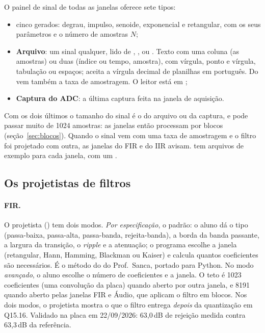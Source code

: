 O painel de sinal de todas as janelas oferece sete tipos:

\begin{itemize}
  \item cinco gerados: degrau, impulso, senoide, exponencial e retangular, com
    os seus parâmetros e o número de amostras \(N\);
  \item \textbf{Arquivo}: um sinal qualquer, lido de , ,
     ou . Texto com uma coluna (as amostras) ou duas
    (índice ou tempo, amostra), com vírgula, ponto e vírgula, tabulação ou
    espaços; aceita a vírgula decimal de planilhas em português. Do
     vem também a taxa de amostragem. O leitor está em
    ;
  \item \textbf{Captura do ADC}: a última captura feita na janela de aquisição.
\end{itemize}

Com os dois últimos o tamanho do sinal é o do arquivo ou da captura, e pode
passar muito de 1024 amostras: as janelas então processam por blocos
(seção~\ref{sec:blocos}). Quando o sinal vem com uma taxa de amostragem e o
filtro foi projetado com outra, as janelas do FIR e do IIR avisam.
 tem arquivos de exemplo para cada janela, com um
.

\subsection*{Os projetistas de filtros}

\paragraph{FIR.} O projetista () tem dois modos. \emph{Por
especificação}, o padrão: o aluno dá o tipo (passa-baixa, passa-alta,
passa-banda, rejeita-banda), a borda da banda passante, a largura da transição,
o \emph{ripple} e a atenuação; o programa escolhe a janela (retangular, Hann,
Hamming, Blackman ou Kaiser) e calcula quantos coeficientes são necessários. É
o método do  do Prof.\ Sanca, portado para Python. No modo
\emph{avançado}, o aluno escolhe o número de coeficientes e a janela. O teto
é 1023 coeficientes (uma convolução da placa) quando aberto por outra janela, e
8191 quando aberto pelas janelas FIR e Áudio, que aplicam o filtro em blocos.
Nos dois modos,
o projetista mostra o que o filtro entrega \emph{depois} da quantização em
Q15.16. Validado na placa em 22/09/2026: 63,0\,dB de rejeição medida contra
63,3\,dB da referência.

